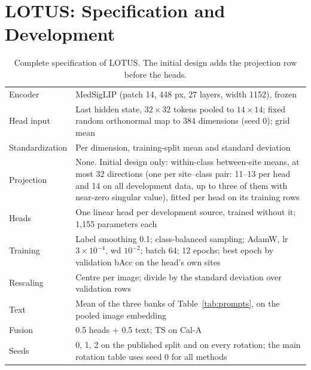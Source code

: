 \documentclass[runningheads]{llncs}
\begin{document}
\section{LOTUS: Specification and Development}\label{s:dev}
\begin{table}[htbp]
\caption{Complete specification of LOTUS. The initial design adds the projection row before the heads.}\label{tab:spec}\centering\scriptsize
\begin{tabular}{@{}lp{}@{}}
\toprule
Encoder & MedSigLIP (patch 14, 448 px, 27 layers, width 1152), frozen\\
Head input & Last hidden state, $32\times32$ tokens pooled to $14\times14$; fixed random orthonormal map to 384 dimensions (seed 0); grid mean\\
Standardization & Per dimension, training-split mean and standard deviation\\
Projection & None. Initial design only: within-class between-site means, at most 32 directions (one per site--class pair: 11--13 per head and 14 on all development data, up to three of them with near-zero singular value), fitted per head on its training rows\\
Heads & One linear head per development source, trained without it; 1,155 parameters each\\
Training & Label smoothing 0.1; class-balanced sampling; AdamW, lr $3\times10^{-4}$, wd $10^{-2}$; batch 64; 12 epochs; best epoch by validation bAcc on the head's own sites\\
Rescaling & Centre per image; divide by the standard deviation over validation rows\\
Text & Mean of the three banks of Table~\ref{tab:prompts}, on the pooled image embedding\\
Fusion & 0.5 heads + 0.5 text; TS on Cal-A\\
Seeds & 0, 1, 2 on the published split and on every rotation; the main rotation table uses seed 0 for all methods\\
\bottomrule
\end{tabular}
\end{table}
\end{document}
